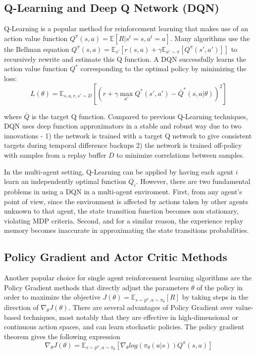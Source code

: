 \subsection{Q-Learning and Deep Q Network (DQN)}

Q-Learning is a popular method for reinforcement learning that makes use of an action value function $Q^{\pi}(s, a) = \mathbb{E}[R | s^t = s, a^t = a]$. Many algorithms use the the Bellman equation $Q^{\pi}(s, a) = \mathbb{E}_{s'}[r(s, a) + \gamma \mathbb{E}_{a' \sim \pi}[Q^{\pi}(s', a')]]$ to recursively rewrite and estimate this Q function. A DQN successfully learns the action value function $Q^*$ corresponding to the optimal policy by minimizing the loss:
\begin{equation}
	L(\theta) = \mathbb{E}_{s,a,r,s'\sim D} [(r + \gamma \max_{a'} Q^{*}(s', a') - \bar{Q}^{*}(s, a | \theta))^2]
\end{equation}

where $\bar{Q}$ is the target Q function. Compared to previous Q-Learning techniques, DQN uses deep function approximators in a stable and robust way due to two innovations - 1) the network is trained with a target Q network to give consistent targets during temporal difference backups 2) the network is trained off-policy with samples from a replay buffer $D$ to minimize correlations between samples.

In the multi-agent setting, Q-Learning can be applied by having each agent $i$ learn an independently optimal function $Q_i$. However, there are two fundamental problems in using a DQN in a multi-agent enviroment. First, from any agent's point of view, since the environment is affected by actions taken by other agents unknown to that agent, the state transition function becomes non stationary, violating MDP criteria. Second, and for a similar reason, the experience replay memory becomes inaccurate in approximating the state transitions probabilities.

\subsection{Policy Gradient and Actor Critic Methods}

Another popular choice for single agent reinforcement learning algorithms are the Policy Gradient methods that directly adjust the parameters $\theta$ of the policy in order to maximize the objective $J(\theta) = \mathbb{E}_{s \sim p^{\pi}, a \sim \pi_{\theta}}[R]$ by taking steps in the direction of $\nabla_{\theta} J(\theta)$. There are several advantages of Policy Gradient over value-based techniques, most notably that they are effective in high-dimensional or continuous action spaces, and can learn stochastic policies. The policy gradient theorem gives the following expression
\begin{equation}
	\nabla_{\theta} J(\theta) = \mathbb{E}_{s \sim p^{\pi}, a \sim \pi_{\theta}} [\nabla_{\theta} log(\pi_{\theta}(a|s))Q^{\pi}(s, a)]
\end{equation}

